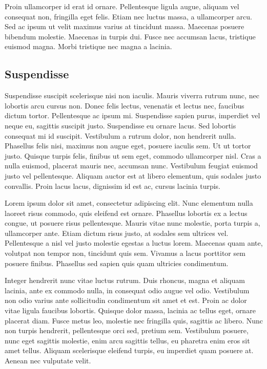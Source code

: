 \documentclass[twoside,openright,a4paper,11pt,french]{article}
\begin{document}
Proin ullamcorper id erat id ornare. Pellentesque ligula augue, aliquam vel consequat non, fringilla eget felis. Etiam nec luctus massa, a ullamcorper arcu. Sed ac ipsum ut velit maximus varius at tincidunt massa. Maecenas posuere bibendum molestie. Maecenas in turpis dui. Fusce nec accumsan lacus, tristique euismod magna. Morbi tristique nec magna a lacinia.

\subsection{Suspendisse}

Suspendisse suscipit scelerisque nisi non iaculis. Mauris viverra rutrum nunc, nec lobortis arcu cursus non. Donec felis lectus, venenatis et lectus nec, faucibus dictum tortor. Pellentesque ac ipsum mi. Suspendisse sapien purus, imperdiet vel neque eu, sagittis suscipit justo. Suspendisse eu ornare lacus. Sed lobortis consequat mi id suscipit. Vestibulum a rutrum dolor, non hendrerit nulla. Phasellus felis nisi, maximus non augue eget, posuere iaculis sem. Ut ut tortor justo. Quisque turpis felis, finibus ut sem eget, commodo ullamcorper nisl. Cras a nulla euismod, placerat mauris nec, accumsan nunc. Vestibulum feugiat euismod justo vel pellentesque. Aliquam auctor est at libero elementum, quis sodales justo convallis. Proin lacus lacus, dignissim id est ac, cursus lacinia turpis.

Lorem ipsum dolor sit amet, consectetur adipiscing elit. Nunc elementum nulla laoreet risus commodo, quis eleifend est ornare. Phasellus lobortis ex a lectus congue, ut posuere risus pellentesque. Mauris vitae nunc molestie, porta turpis a, ullamcorper ante. Etiam dictum risus justo, at sodales sem ultrices vel. Pellentesque a nisl vel justo molestie egestas a luctus lorem. Maecenas quam ante, volutpat non tempor non, tincidunt quis sem. Vivamus a lacus porttitor sem posuere finibus. Phasellus sed sapien quis quam ultricies condimentum.

Integer hendrerit nunc vitae luctus rutrum. Duis rhoncus, magna et aliquam lacinia, ante ex commodo nulla, in consequat odio augue vel odio. Vestibulum non odio varius ante sollicitudin condimentum sit amet et est. Proin ac dolor vitae ligula faucibus lobortis. Quisque dolor massa, lacinia ac tellus eget, ornare placerat diam. Fusce metus leo, molestie nec fringilla quis, sagittis ac libero. Nunc non turpis hendrerit, pellentesque orci sed, pretium sem. Vestibulum posuere, nunc eget sagittis molestie, enim arcu sagittis tellus, eu pharetra enim eros sit amet tellus. Aliquam scelerisque eleifend turpis, eu imperdiet quam posuere at. Aenean nec vulputate velit.
\end{document}
